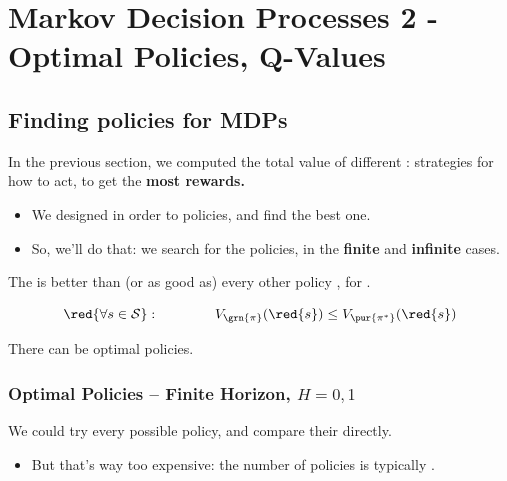 \setcounter{chapter}{10-1} %

\chapter{Markov Decision Processes 2 - Optimal Policies, Q-Values}

\setcounter{section}{1}


\section{Finding policies for MDPs}

    In the previous section, we computed the total value of different : strategies for how to act, to get the \textbf{most rewards.}

    \begin{itemize}
        \item We designed  in order to  policies, and find the best one.
        \item So, we'll do that: we search for the  policies, in the \textbf{finite} and \textbf{infinite} cases.\\
    \end{itemize}

    \begin{definition}
        The  \pur{$\pi^*$} is better than (or as good as) every other policy \grn{$\pi$}, for .

        \begin{equation*}
            \red{\forall s \in \mathcal{S}}: \qquad \qquad 
            V_{\grn{\pi}}(\red{s}) \leq V_{\pur{\pi^*}}(\red{s})
        \end{equation*}

        There can be  optimal policies.
    \end{definition}

    

    \phantom{}

    \subsection{Optimal Policies -- Finite Horizon, $H=0,1$}

        We could try every possible policy, and compare their  directly.

        \begin{itemize}
            \item But that's way too expensive: the number of policies is typically . 
        \end{itemize}

